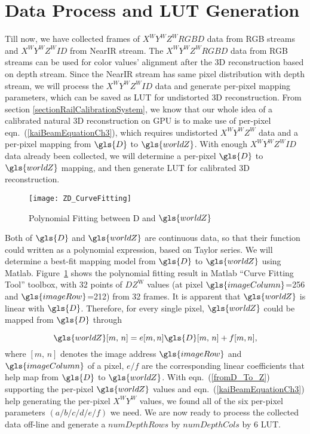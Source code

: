 \section{Data Process and \gls{LUT} Generation}
Till now, we have collected frames of \(X^WY^WZ^WRGBD\) data from RGB streams and \(X^WY^WZ^WID\) from \gls{NearIR} stream. The \(X^WY^WZ^WRGBD\) data from RGB streams can be used for color values' alignment after the \gls{3D} reconstruction based on depth stream. Since the \gls{NearIR} stream has same pixel distribution with depth stream, we will process the \(X^WY^WZ^WID\) data and generate per-pixel mapping parameters, which can be saved as \gls{LUT} for undistorted \gls{3D} reconstruction. From section \ref{sectionRailCalibrationSystem}, we know that our whole idea of a calibrated natural \gls{3D} reconstruction on \gls{GPU} is to make use of per-pixel eqn.~(\ref{kaiBeamEquationCh3}), which requires undistorted \(X^WY^WZ^W\) data and a per-pixel mapping from \(\gls{D}\) to \(\gls{worldZ}\). With enough \(X^WY^WZ^WID\) data already been collected, we will determine a per-pixel \(\gls{D}\) to \(\gls{worldZ}\) mapping, and then generate \gls{LUT} for calibrated \gls{3D} reconstruction.
\\\indent
\begin{figure}[b]
\centering
\texttt{[image: ZD\_CurveFitting]}
\caption{Polynomial Fitting between \gls{D} and \(\gls{worldZ}\)}
\label{ZD_CurveFitting}
\end{figure}%
%
Both of \(\gls{D}\) and \(\gls{worldZ}\) are continuous data, so that their function could written as a polynomial expression, based on Taylor series. We will determine a best-fit mapping model from \(\gls{D}\) to \(\gls{worldZ}\) using Matlab. Figure~\ref{ZD_CurveFitting} shows the polynomial fitting result in Matlab \enquote{Curve Fitting Tool} toolbox, with 32 points of \(DZ^\text{W}\) values (at pixel \(\gls{imageColumn}\)=256 and \(\gls{imageRow}\)=212) from 32 frames. It is apparent that \(\gls{worldZ}\) is linear with \(\gls{D}\). Therefore, for every single pixel, \(\gls{worldZ}\) could be mapped from \(\gls{D}\) through \par
%
\begin{equation}
\gls{worldZ}[m, \, n] = e[m, n]\gls{D}[m, \, n]+f[m, n] ,
\label{fromD_To_Z}
\end{equation}%
%
\noindent
where \([m, \, n]\) denotes the image address \(\gls{imageRow}\) and \(\gls{imageColumn}\) of a pixel, \(e/f\) are the corresponding linear coefficients that help map from \(\gls{D}\) to \(\gls{worldZ}\). With eqn.~(\ref{fromD_To_Z}) supporting the per-pixel \(\gls{worldZ}\) values and eqn.~(\ref{kaiBeamEquationCh3}) help generating the per-pixel \(X^WY^W\) values, we found all of the six per-pixel parameters \((a/b/c/d/e/f)\) we need. We are now ready to process the collected data off-line and generate a \(numDepthRows\) by \(numDepthCols\) by 6 \gls{LUT}.
